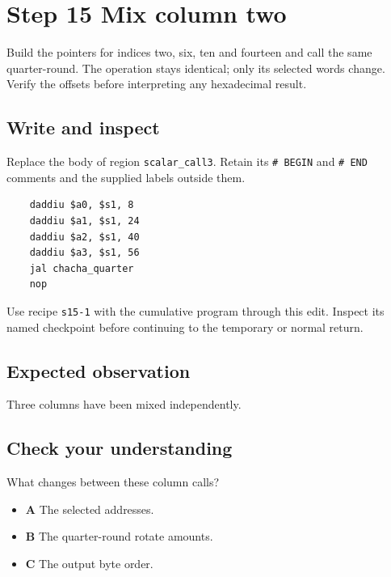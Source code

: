 \section{Step 15 Mix column two}\label{chacha-s15}

Build the pointers for indices two, six, ten and fourteen and call the same quarter-round. The operation stays identical; only its selected words change. Verify the offsets before interpreting any hexadecimal result.

\subsection{Write and inspect}
Replace the body of region \texttt{scalar\_call3}. Retain its \texttt{\# BEGIN} and \texttt{\# END} comments and the supplied labels outside them.

\begin{verbatim}
    daddiu $a0, $s1, 8
    daddiu $a1, $s1, 24
    daddiu $a2, $s1, 40
    daddiu $a3, $s1, 56
    jal chacha_quarter
    nop
\end{verbatim}

Use recipe \texttt{s15-1} with the cumulative program through this edit. Inspect its named checkpoint before continuing to the temporary or normal return.

\subsection{Expected observation}
Three columns have been mixed independently.

\subsection{Check your understanding}
What changes between these column calls?

\begin{itemize}
  \item \textbf{A} The selected addresses.
  \item \textbf{B} The quarter-round rotate amounts.
  \item \textbf{C} The output byte order.
\end{itemize}
